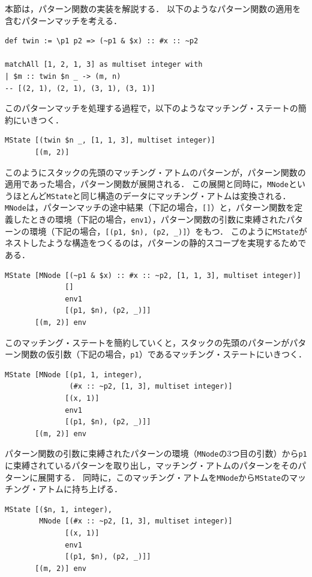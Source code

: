 本節は，パターン関数の実装を解説する．
以下のようなパターン関数の適用を含むパターンマッチを考える．
\begin{lstlisting}[language=egison,numbers=none]
def twin := \p1 p2 => (~p1 & $x) :: #x :: ~p2

matchAll [1, 2, 1, 3] as multiset integer with
| $m :: twin $n _ -> (m, n)
-- [(2, 1), (2, 1), (3, 1), (3, 1)]
\end{lstlisting}
このパターンマッチを処理する過程で，以下のようなマッチング・ステートの簡約にいきつく．
\begin{lstlisting}[language=egison,numbers=none]
MState [(twin $n _, [1, 1, 3], multiset integer)]
       [(m, 2)]
\end{lstlisting}
このようにスタックの先頭のマッチング・アトムのパターンが，パターン関数の適用であった場合，パターン関数が展開される．
この展開と同時に，\lstinline{MNode}というほとんど\lstinline{MState}と同じ構造のデータにマッチング・アトムは変換される．
\lstinline{MNode}は，パターンマッチの途中結果（下記の場合，\lstinline{[]}）と，パターン関数を定義したときの環境（下記の場合，\lstinline{env1}），パターン関数の引数に束縛されたパターンの環境（下記の場合，\lstinline{[(p1, $n), (p2, _)]}）をもつ．
このように\lstinline{MState}がネストしたような構造をつくるのは，パターンの静的スコープを実現するためである．
\begin{lstlisting}[language=egison,numbers=none]
MState [MNode [(~p1 & $x) :: #x :: ~p2, [1, 1, 3], multiset integer)]
              []
              env1
              [(p1, $n), (p2, _)]]
       [(m, 2)] env
\end{lstlisting}
このマッチング・ステートを簡約していくと，スタックの先頭のパターンがパターン関数の仮引数（下記の場合，\lstinline{p1}）であるマッチング・ステートにいきつく．
\begin{lstlisting}[language=egison,numbers=none]
MState [MNode [(p1, 1, integer),
               (#x :: ~p2, [1, 3], multiset integer)]
              [(x, 1)]
              env1
              [(p1, $n), (p2, _)]]
       [(m, 2)] env
\end{lstlisting}
パターン関数の引数に束縛されたパターンの環境（\lstinline{MNode}の3つ目の引数）から\lstinline{p1}に束縛されているパターンを取り出し，マッチング・アトムのパターンをそのパターンに展開する．
同時に，このマッチング・アトムを\lstinline{MNode}から\lstinline{MState}のマッチング・アトムに持ち上げる．
\begin{lstlisting}[language=egison,numbers=none]
MState [($n, 1, integer),
        MNode [(#x :: ~p2, [1, 3], multiset integer)]
              [(x, 1)]
              env1
              [(p1, $n), (p2, _)]]
       [(m, 2)] env
\end{lstlisting}



